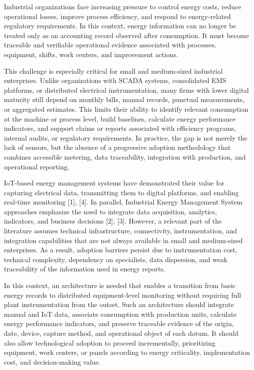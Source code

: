 \documentclass{ieeeaccess}
\begin{document}
Industrial organizations face increasing pressure to control energy costs, reduce operational losses, improve process efficiency, and respond to energy-related regulatory requirements. In this context, energy information can no longer be treated only as an accounting record observed after consumption. It must become traceable and verifiable operational evidence associated with processes, equipment, shifts, work centers, and improvement actions.

This challenge is especially critical for small and medium-sized industrial enterprises. Unlike organizations with SCADA systems, consolidated EMS platforms, or distributed electrical instrumentation, many firms with lower digital maturity still depend on monthly bills, manual records, punctual measurements, or aggregated estimates. This limits their ability to identify relevant consumption at the machine or process level, build baselines, calculate energy performance indicators, and support claims or reports associated with efficiency programs, internal audits, or regulatory requirements. In practice, the gap is not merely the lack of sensors, but the absence of a progressive adoption methodology that combines accessible metering, data traceability, integration with production, and operational reporting.

IoT-based energy management systems have demonstrated their value for capturing electrical data, transmitting them to digital platforms, and enabling real-time monitoring [1], [4]. In parallel, Industrial Energy Management System approaches emphasize the need to integrate data acquisition, analytics, indicators, and business decisions [2], [3]. However, a relevant part of the literature assumes technical infrastructure, connectivity, instrumentation, and integration capabilities that are not always available in small and medium-sized enterprises. As a result, adoption barriers persist due to instrumentation cost, technical complexity, dependency on specialists, data dispersion, and weak traceability of the information used in energy reports.

In this context, an architecture is needed that enables a transition from basic energy records to distributed equipment-level monitoring without requiring full plant instrumentation from the outset. Such an architecture should integrate manual and IoT data, associate consumption with production units, calculate energy performance indicators, and preserve traceable evidence of the origin, date, device, capture method, and operational object of each datum. It should also allow technological adoption to proceed incrementally, prioritizing equipment, work centers, or panels according to energy criticality, implementation cost, and decision-making value.
\end{document}
